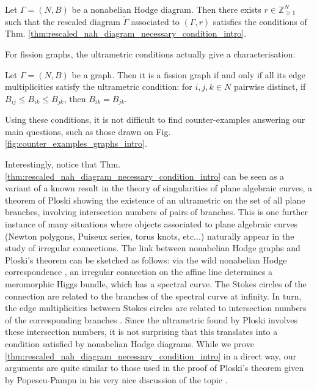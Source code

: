 \documentclass[11pt,a4paper]{amsart}
\numberwithin{equation}{section}
\begin{document}
\begin{corollary}
Let $\Gamma=(N, B)$ be a nonabelian Hodge diagram. Then there exists $r\in \mathbb Z_{\geq 1}^N$ such that the rescaled diagram $\widetilde \Gamma$ associated to $(\Gamma, r)$ satisfies the conditions of Thm. \ref{thm:rescaled_nah_diagram_necessary_condition_intro}.
\end{corollary}

For fission graphs, the ultrametric conditions actually give a characterisation:

\begin{theorem}
\label{thm:characterisation_fission_graphs_triangles_intro}
Let $\Gamma=(N,B)$ be a graph. Then it is a fission graph if and only if all its edge multiplicities satisfy the ultrametric condition: for $i,j,k\in N$ pairwise distinct, if $B_{ij}\leq B_{ik}\leq B_{jk}$, then $B_{ik}=B_{jk}$.
\end{theorem}

Using these conditions, it is not difficult to find counter-examples answering our main questions, such as those drawn on Fig. \ref{fig:counter_examples_graphs_intro}.



Interestingly, notice that Thm. \ref{thm:rescaled_nah_diagram_necessary_condition_intro} can be seen as a variant of a known result in the theory of singularities of plane algebraic curves, a theorem of Ploski \cite{ploski1985remarque} showing the existence of an ultrametric on the set of all plane branches, involving intersection numbers of pairs of branches. This is one further instance of many situations where objects associated to plane algebraic curves (Newton polygons, Puiseux series, torus knots, etc...) naturally appear in the study of irregular connections. The link between nonabelian Hodge graphs and Ploski's theorem can be sketched as follows:  via the wild nonabelian Hodge correspondence \cite{sabbah1999harmonic,biquard2004wild}, an irregular connection on the affine line determines a meromorphic Higgs bundle, which has a spectral curve. The Stokes circles of the connection are related to the branches of the spectral curve at infinity. In turn, the edge multiplicities between Stokes circles are related to intersection numbers of the corresponding branches \cite{hiroe2017ramified}. Since the ultrametric found by Ploski involves these intersection numbers, it is not surprising that this translates into a condition satisfied by nonabelian Hodge diagrams. While we prove \ref{thm:rescaled_nah_diagram_necessary_condition_intro} in a direct way, our arguments are quite similar to those used in the proof of Ploski's theorem given by Popescu-Pampu in his very nice discussion of the topic \cite{popescu2020ultrametrics}.
\end{document}
